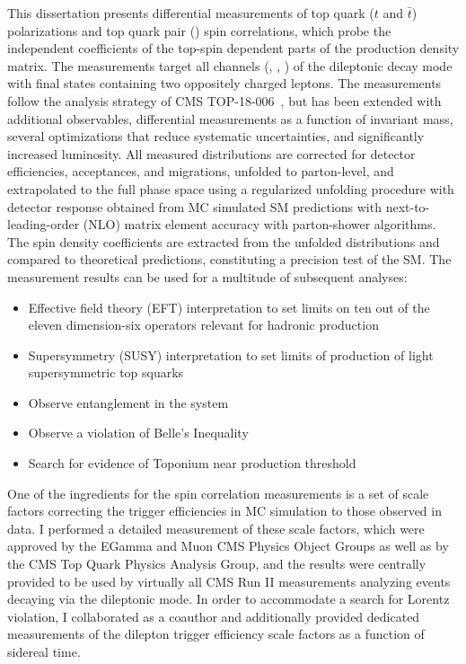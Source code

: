 This dissertation presents differential measurements of top quark ($t$ and $\bar{t}$) polarizations and top quark pair (\ttbar) spin correlations, which probe the independent coefficients of the top-spin dependent parts of the \ttbar production density matrix.
The measurements target all channels (\ee, \emu, \mumu) of the \ttbar dileptonic decay mode with final states containing two oppositely charged leptons.
The measurements follow the analysis strategy of CMS TOP-18-006~\cite{Sirunyan:2681777}, but has been extended with additional observables, differential measurements as a function of \ttbar invariant mass, several optimizations that reduce systematic uncertainties, and significantly increased luminosity.
All measured distributions are corrected for detector efficiencies, acceptances, and migrations, unfolded to parton-level, and extrapolated to the full phase space using a regularized unfolding procedure with detector response obtained from MC simulated SM predictions with next-to-leading-order (NLO) matrix element accuracy with parton-shower algorithms.
The spin density coefficients are extracted from the unfolded distributions and compared to theoretical predictions, constituting a precision test of the SM.
The measurement results can be used for a multitude of subsequent analyses:
\begin{itemize}
    \item Effective field theory (EFT) interpretation to set limits on ten out of the eleven dimension-six operators relevant for hadronic \ttbar production~\cite{Sirunyan:2681777}
    \item Supersymmetry (SUSY) interpretation to set limits of production of light supersymmetric top squarks~\cite{CMS-PAS-FTR-18-034}
    \item Observe entanglement in the \ttbar system~\cite{Afik_2021}
    \item Observe a violation of Belle's Inequality~\cite{Aguilar_Saavedra_2022}
    \item Search for evidence of Toponium near \ttbar production threshold~\cite{PhysRevD.104.034023}
\end{itemize}

One of the ingredients for the \ttbar spin correlation measurements is a set of scale factors correcting the trigger efficiencies in MC simulation to those observed in data.
I performed a detailed measurement of these scale factors, which were approved by the EGamma and Muon CMS Physics Object Groups as well as by the CMS Top Quark Physics Analysis Group, and the results were centrally provided to be used by virtually all CMS Run II measurements analyzing \ttbar events decaying via the dileptonic mode.
In order to accommodate a search for Lorentz violation, I collaborated as a coauthor and additionally provided dedicated measurements of the dilepton trigger efficiency scale factors as a function of sidereal time.

